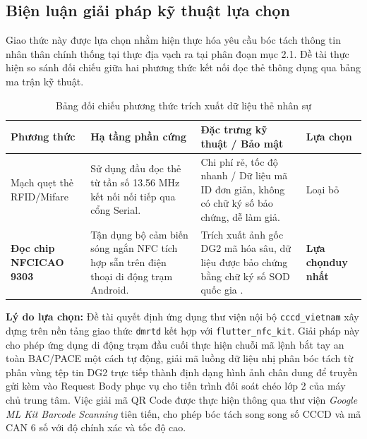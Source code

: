 \documentclass[../DoAn.tex]{subfiles}
\begin{document}
\subsection{Biện luận giải pháp kỹ thuật lựa chọn}

Giao thức này được lựa chọn nhằm hiện thực hóa yêu cầu bóc tách thông tin nhân thân chính thống tại thực địa vạch ra tại phân đoạn mục 2.1. Đề tài thực hiện so sánh đối chiếu giữa hai phương thức kết nối đọc thẻ thông dụng qua bảng ma trận kỹ thuật.

\begin{table}[ht!]
\centering
\small
\renewcommand{\arraystretch}{1.3}
\caption{Bảng đối chiếu phương thức trích xuất dữ liệu thẻ nhân sự}
\label{tab:nfc_comparison}
\begin{tabular}{|>{\raggedright\arraybackslash}p{2.3cm}|>{\raggedright\arraybackslash}p{4.5cm}|>{\raggedright\arraybackslash}p{5.5cm}|>{\centering\arraybackslash}p{1.7cm}|}
\hline
\textbf{Phương thức} & \textbf{Hạ tầng phần cứng} & \textbf{Đặc trưng kỹ thuật / Bảo mật} & \textbf{Lựa chọn} \\ \hline
Mạch quẹt thẻ RFID/Mifare & Sử dụng đầu đọc thẻ từ tần số 13.56 MHz kết nối nối tiếp qua cổng Serial. & Chi phí rẻ, tốc độ nhanh / Dữ liệu mã ID đơn giản, không có chữ ký số bảo chứng, dễ làm giả. & Loại bỏ \\ \hline
\textbf{Đọc chip NFC\newline ICAO 9303} & Tận dụng bộ cảm biến sóng ngắn NFC tích hợp sẵn trên điện thoại di động trạm Android. & Trích xuất ảnh gốc DG2 mã hóa sâu, dữ liệu được bảo chứng bằng chữ ký số SOD quốc gia \cite{icao9303}. & \textbf{Lựa chọn\newline duy nhất} \\ \hline
\end{tabular}
\end{table}

\textbf{Lý do lựa chọn:} Đề tài quyết định ứng dụng thư viện nội bộ \texttt{cccd\_vietnam} xây dựng trên nền tảng giao thức \texttt{dmrtd} kết hợp với \texttt{flutter\_nfc\_kit}. Giải pháp này cho phép ứng dụng di động trạm đầu cuối thực hiện chuỗi mã lệnh bắt tay an toàn BAC/PACE một cách tự động, giải mã luồng dữ liệu nhị phân bóc tách từ phân vùng tệp tin DG2 trực tiếp thành định dạng hình ảnh chân dung để truyền gửi kèm vào Request Body phục vụ cho tiến trình đối soát chéo lớp 2 của máy chủ trung tâm. Việc giải mã QR Code được thực hiện thông qua thư viện \textit{Google ML Kit Barcode Scanning} tiên tiến, cho phép bóc tách song song số CCCD và mã CAN 6 số với độ chính xác và tốc độ cao.
\end{document}
